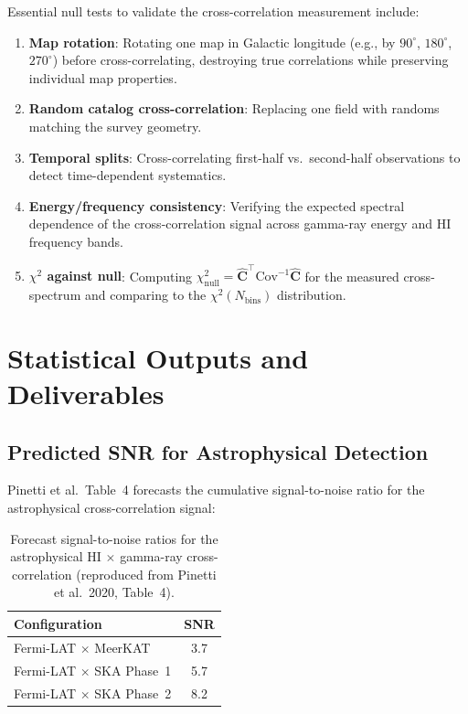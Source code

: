 \documentclass[10pt,a4paper]{article}
\begin{document}
Essential null tests to validate the cross-correlation measurement include:
\begin{enumerate}[leftmargin=2em]
\item \textbf{Map rotation}: Rotating one map in Galactic longitude (e.g., by $90^\circ$, $180^\circ$, $270^\circ$) before cross-correlating, destroying true correlations while preserving individual map properties.
\item \textbf{Random catalog cross-correlation}: Replacing one field with randoms matching the survey geometry.
\item \textbf{Temporal splits}: Cross-correlating first-half vs.\ second-half observations to detect time-dependent systematics.
\item \textbf{Energy/frequency consistency}: Verifying the expected spectral dependence of the cross-correlation signal across gamma-ray energy and HI frequency bands.
\item \textbf{$\chi^2$ against null}: Computing $\chi^2_{\mathrm{null}} = \hat{\mathbf{C}}^\top \mathrm{Cov}^{-1} \hat{\mathbf{C}}$ for the measured cross-spectrum and comparing to the $\chi^2(N_{\mathrm{bins}})$ distribution.
\end{enumerate}


\section{Statistical Outputs and Deliverables}
\label{sec:outputs}

\subsection{Predicted SNR for Astrophysical Detection}

Pinetti et al.\ Table~4 forecasts the cumulative signal-to-noise ratio for the astrophysical cross-correlation signal:

\begin{table}[h]
\centering
\begin{tabular}{@{}lc@{}}
\toprule
Configuration & SNR \\
\midrule
Fermi-LAT $\times$ MeerKAT & 3.7 \\
Fermi-LAT $\times$ SKA Phase~1 & 5.7 \\
Fermi-LAT $\times$ SKA Phase~2 & 8.2 \\
\bottomrule
\end{tabular}
\caption{Forecast signal-to-noise ratios for the astrophysical HI $\times$ gamma-ray cross-correlation (reproduced from Pinetti et al.\ 2020, Table~4).}
\label{tab:snr}
\end{table}
\end{document}
